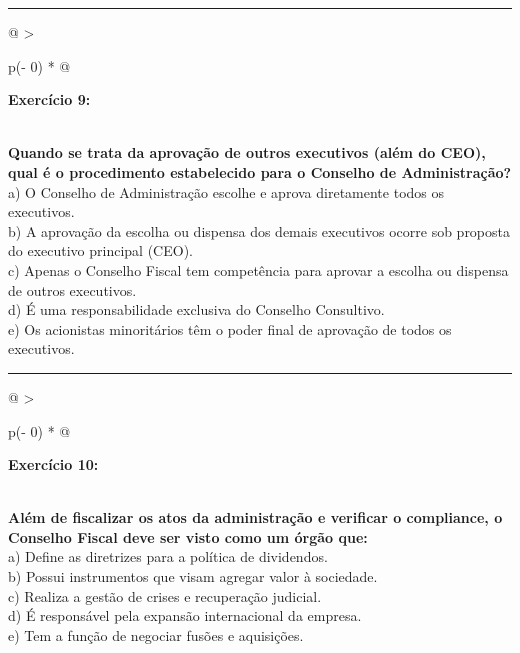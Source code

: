 \documentclass[
]{book}
\begin{document}
\begin{center}\rule{0.5\linewidth}{0.5pt}\end{center}

\begin{longtable}[]{@{}
  >{\raggedright\arraybackslash}p{(\columnwidth - 0\tabcolsep) * }@{}}
\toprule\noalign{}
\begin{minipage}[b]{\linewidth}\raggedright
\textbf{Exercício 9:}
\end{minipage} \\
\midrule\noalign{}
\endhead
\bottomrule\noalign{}
\endlastfoot
\textbf{Quando se trata da aprovação de outros executivos (além do CEO), qual é o procedimento estabelecido para o Conselho de Administração?} \\
a) O Conselho de Administração escolhe e aprova diretamente todos os executivos. \\
b) A aprovação da escolha ou dispensa dos demais executivos ocorre sob proposta do executivo principal (CEO). \\
c) Apenas o Conselho Fiscal tem competência para aprovar a escolha ou dispensa de outros executivos. \\
d) É uma responsabilidade exclusiva do Conselho Consultivo. \\
e) Os acionistas minoritários têm o poder final de aprovação de todos os executivos. \\
\end{longtable}

\begin{center}\rule{0.5\linewidth}{0.5pt}\end{center}

\begin{longtable}[]{@{}
  >{\raggedright\arraybackslash}p{(\columnwidth - 0\tabcolsep) * }@{}}
\toprule\noalign{}
\begin{minipage}[b]{\linewidth}\raggedright
\textbf{Exercício 10:}
\end{minipage} \\
\midrule\noalign{}
\endhead
\bottomrule\noalign{}
\endlastfoot
\textbf{Além de fiscalizar os atos da administração e verificar o compliance, o Conselho Fiscal deve ser visto como um órgão que:} \\
a) Define as diretrizes para a política de dividendos. \\
b) Possui instrumentos que visam agregar valor à sociedade. \\
c) Realiza a gestão de crises e recuperação judicial. \\
d) É responsável pela expansão internacional da empresa. \\
e) Tem a função de negociar fusões e aquisições. \\
\end{longtable}
\end{document}
